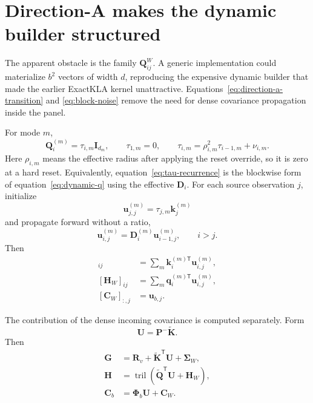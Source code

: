 \documentclass[11pt]{article}
\newcommand{\ve}[1]{\boldsymbol{#1}}
\newcommand{\tr}{\mathsf{T}}
\DeclareMathOperator{\tril}{tril}
\begin{document}
\section{Direction-A makes the dynamic builder structured}

The apparent obstacle is the family $\ve{Q}_{ij}^{W}$.  A generic implementation could
materialize $b^2$ vectors of width $d$, reproducing the expensive dynamic builder that made the
earlier ExactKLA kernel unattractive.  Equations~\eqref{eq:direction-a-transition} and
\eqref{eq:block-noise} remove the need for dense covariance propagation inside the panel.

For mode $m$,
\begin{equation}
  \ve{Q}_i^{(m)}=\tau_{i,m}\ve{I}_{d_m},
  \qquad
  \tau_{1,m}=0,
  \qquad
  \tau_{i,m}=\rho_{i,m}^2\tau_{i-1,m}+\nu_{i,m}.
  \label{eq:tau-recurrence}
\end{equation}
Here $\rho_{i,m}$ means the effective radius after applying the reset override, so it is zero at a
hard reset.  Equivalently, equation~\eqref{eq:tau-recurrence} is the blockwise form of
equation~\eqref{eq:dynamic-q} using the effective $\ve{D}_i$.
For each source observation $j$, initialize
\begin{equation}
  \ve{u}_{j,j}^{(m)}=\tau_{j,m}\ve{k}_j^{(m)}
  \label{eq:u-initialize}
\end{equation}
and propagate forward without a ratio,
\begin{equation}
  \ve{u}_{i,j}^{(m)}
  =\ve{D}_i^{(m)}\ve{u}_{i-1,j}^{(m)},
  \qquad i>j.
  \label{eq:u-propagate}
\end{equation}
Then
\begin{align}
  [\ve{\Sigma}_W]_{ij}
    &=\sum_m
      \ve{k}_i^{(m)\tr}\ve{u}_{i,j}^{(m)},
  \label{eq:structured-sigma}\\
  [\ve{H}_W]_{ij}
    &=\sum_m
      \ve{q}_i^{(m)\tr}\ve{u}_{i,j}^{(m)},
  \label{eq:structured-h}\\
  [\ve{C}_W]_{:,j}
    &=\ve{u}_{b,j}.
  \label{eq:structured-c}
\end{align}

The contribution of the dense incoming covariance is computed separately.  Form
\begin{equation}
  \ve{U}=\ve{P}^-\widetilde{\ve{K}}.
  \label{eq:dense-u}
\end{equation}
Then
\begin{align}
  \ve{G}
    &=\ve{R}_v+\widetilde{\ve{K}}^{\tr}\ve{U}+\ve{\Sigma}_W,
  \label{eq:assembled-g}\\
  \ve{H}
    &=\tril\!\left(
      \widetilde{\ve{Q}}^{\tr}\ve{U}+\ve{H}_W
      \right),
  \label{eq:assembled-h}\\
  \ve{C}_b
    &=\ve{\Phi}_b\ve{U}+\ve{C}_W.
  \label{eq:assembled-c}
\end{align}
\end{document}

